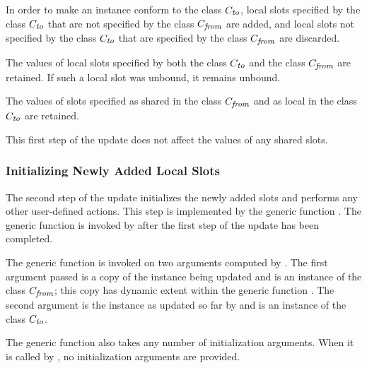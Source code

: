 In order to make an instance conform to the class $C_
{\hbox{{\footnotesize\it to}}}$, local slots specified by the class $C_
{\hbox{{\footnotesize\it to}}}$ that are not specified by the class $C_
{\hbox{{\footnotesize\it from}}}$ are added, and local slots not specified by
the class $C_ {\hbox{{\footnotesize\it to}}}$ that are specified by the
class $C_ {\hbox{{\footnotesize\it from}}}$ are discarded.

The values of local slots specified by both the class $C_
{\hbox{{\footnotesize\it to}}}$ and the class $C_ {\hbox{{\footnotesize\it
from}}}$ are retained. If such a local slot was unbound, it remains
unbound.

The values of slots specified as shared in the class $C_
{\hbox{{\footnotesize\it from}}}$ and as local in the class $C_
{\hbox{{\footnotesize\it to}}}$ are retained.

This first step of the update does not affect the values of any shared
slots.


\subsubsection{Initializing Newly Added Local Slots}

The second step of the update initializes the newly added slots and
performs any other user-defined actions.  This step is implemented by
the generic function .  The
generic function  is invoked
by  after the first step of the update has been
completed.

The generic function  is
invoked on two arguments computed by .  The first
argument passed is a copy of the instance being updated and is an
instance of the class $C_ {\hbox{{\footnotesize\it from}}}$; this copy has
dynamic extent within the generic function .  The
second argument is the instance as updated so far by 
and is an instance of the class $C_ {\hbox{{\footnotesize\it to}}}$.

The generic function  also
takes any number of initialization arguments.  When it is called by
, no initialization arguments are provided.

